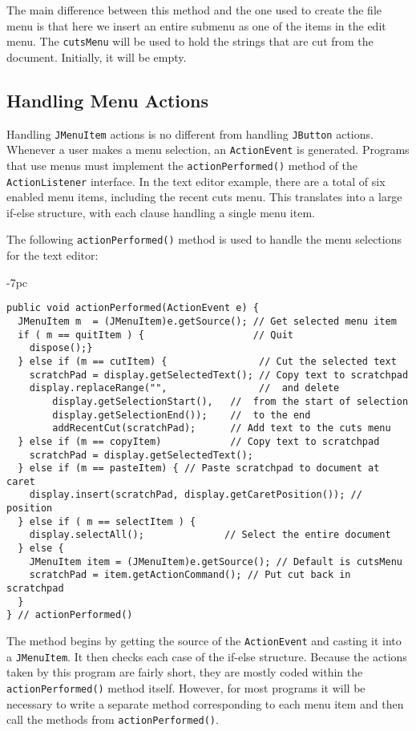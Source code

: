 \noindent The main difference between this method and the
one used to create the file menu is that here we insert an entire
submenu as one of the items in the edit menu. The {\tt cutsMenu} will
be used to hold the strings that are cut from the document.  Initially,
it will be empty.


\subsection{Handling Menu Actions}
\noindent Handling {\tt JMenuItem} actions is no different from handling
{\tt JButton} actions. Whenever a user makes a menu selection, an
{\tt ActionEvent} is generated. Programs that use menus must implement the
{\tt action\-Performed()} method of the {\tt ActionListener} interface.
In the text editor example, there are a total of six enabled menu
items, including the recent cuts menu. This translates into a large
if-else structure, with each clause handling a single menu item. 

The following {\tt actionPerformed()} method is used to handle the
menu selections for the text editor:

\begin{jjjlistingleft}[33pc]{-7pc}
\begin{lstlisting}
public void actionPerformed(ActionEvent e) {
  JMenuItem m  = (JMenuItem)e.getSource(); // Get selected menu item
  if ( m == quitItem ) {                   // Quit
    dispose();}
  } else if (m == cutItem) {                // Cut the selected text
    scratchPad = display.getSelectedText(); // Copy text to scratchpad
    display.replaceRange("",                //  and delete
        display.getSelectionStart(),   //  from the start of selection
        display.getSelectionEnd());    //  to the end
        addRecentCut(scratchPad);      // Add text to the cuts menu
  } else if (m == copyItem)            // Copy text to scratchpad
    scratchPad = display.getSelectedText();
  } else if (m == pasteItem) { // Paste scratchpad to document at caret
    display.insert(scratchPad, display.getCaretPosition()); // position
  } else if ( m == selectItem ) {
    display.selectAll();              // Select the entire document
  } else {
    JMenuItem item = (JMenuItem)e.getSource(); // Default is cutsMenu
    scratchPad = item.getActionCommand(); // Put cut back in scratchpad
  }
} // actionPerformed()
\end{lstlisting}
\end{jjjlistingleft}

\noindent The method begins by getting the source of the {\tt ActionEvent}
and casting it into a {\tt JMenuItem}. It then checks each case of the
if-else structure. Because the actions taken by this program are
fairly short, they are mostly coded within the {\tt actionPerformed()}
method itself. However, for most programs it will be necessary to write
a separate method corresponding to each menu item and then call
the methods from {\tt actionPerformed()}.

